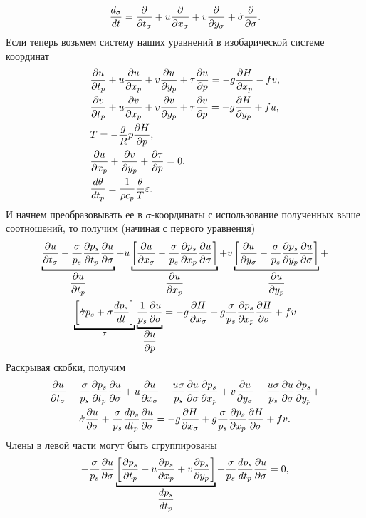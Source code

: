 \begin{equation*}
    \frac{d_{\sigma}}{dt} = \displaystyle\frac{\partial }{\partial t_{\sigma}} + u\displaystyle\frac{\partial }{\partial x_{\sigma}} + v\displaystyle\frac{\partial }{\partial y_{\sigma}} + \dot{\sigma}\displaystyle\frac{\partial }{\partial \sigma}.
\end{equation*}
Если теперь возьмем  систему  наших уравнений в изобарической системе координат 
\begin{align*}
    &\pd{u}{t_p} + u\pd{u}{x_p} + v\pd{u}{y_p} + \tau\pd{u}{p} = -g\pd{H}{x_p} - fv,\\ %
    &\pd{v}{t_p} + u\pd{v}{x_p} + v\pd{v}{y_p} + \tau\pd{v}{p} = -g\pd{H}{y_p} + fu,\\ %
    &T = -\frac{g}{R}p\pd{H}{p},\\
    &\pd{u}{x_p} + \pd{v}{y_p} + \pd{\tau}{p} = 0, \\
    &\td{\theta}{t_p} = \frac{1}{\rho c_p} \frac{\theta}{T}\varepsilon.
\end{align*}
И начнем преобразовывать ее в $\sigma$-координаты с использование полученных выше соотношений, то получим (начиная с первого уравнения)
\begin{multline*}
    \underbracket{\pd{u}{t_{\sigma}}-\frac{\sigma}{p_s}\pd{p_s}{t_p}\pd{u}{\sigma}}_{\pd{u}{t_p}} + 
    u\underbracket{\left[ \pd{u}{x_{\sigma}} - \frac{\sigma}{p_s} \pd{p_s}{x_p} \pd{u}{\sigma} \right]}_{\pd{u}{x_p}} + 
    v\underbracket{\left[ \pd{u}{y_{\sigma}} - \frac{\sigma}{p_s} \pd{p_s}{y_p} \pd{u}{\sigma} \right]}_{\pd{u}{y_p}} + \\
    \underbracket{\left[ \dot{\sigma}p_s + \sigma\td{p_s}{t} \right]}_{\tau} \underbracket{\frac{1}{p_s}\pd{u}{\sigma}}_{\pd{u}{p}} = 
    -g\pd{H}{x_{\sigma}} + g\frac{\sigma}{p_s}\pd{p_s}{x_p}\pd{H}{\sigma} + fv
\end{multline*}
Раскрывая скобки, получим
\begin{multline*}
    \displaystyle\frac{\partial u}{\partial t_{\sigma}} - 
    \frac{\sigma}{p_s}\displaystyle\frac{\partial p_s}{\partial t_p}\displaystyle\frac{\partial u}{\partial \sigma} + 
        u\displaystyle\frac{\partial u}{\partial x_{\sigma}} - \frac{u\sigma}{p_s}\displaystyle\frac{\partial u}{\partial \sigma}\displaystyle\frac{\partial p_s}{\partial x_p} + 
        v\displaystyle\frac{\partial u}{\partial y_{\sigma}} - \frac{u\sigma}{p_s}\displaystyle\frac{\partial u}{\partial \sigma}\displaystyle\frac{\partial p_s}{\partial y_p} + \\
        \dot{\sigma}\displaystyle\frac{\partial u}{\partial \sigma} + 
        \frac{\sigma}{p_s}\displaystyle\frac{d p_s}{d t_p}\displaystyle\frac{\partial u}{\partial \sigma} = 
        -g\displaystyle\frac{\partial H}{\partial x_{\sigma}}+g\frac{\sigma}{p_s}\displaystyle\frac{\partial p_s}{\partial x_p}\displaystyle\frac{\partial H}{\partial \sigma}+fv.
\end{multline*}
Члены в левой части могут быть сгруппированы
\begin{equation*}
    -\frac{\sigma}{p_s}\pd{u}{\sigma} \underbracket{\left[ \pd{p_s}{t_p}+u\pd{p_s}{x_p}+v\pd{p_s}{y_p} \right]}_{\td{p_s}{t_p}} + 
    \frac{\sigma}{p_s}\td{p_s}{t_p}\pd{u}{\sigma} = 0,
\end{equation*}
